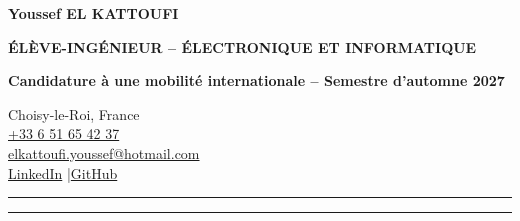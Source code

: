 \documentclass[9pt,a4paper]{extarticle}
\newcommand{\stage}{Candidature à une mobilité internationale – Semestre d'automne 2027}
\begin{document}
\begin{minipage}[t]{.635\linewidth}
  {\fontsize{21.2}{22.3}\selectfont\bfseries\color{bleu}Youssef EL KATTOUFI}\par\vspace{1.5pt}
  {\fontsize{10.2}{11.5}\selectfont\bfseries\color{rouge}ÉLÈVE-INGÉNIEUR -- ÉLECTRONIQUE ET INFORMATIQUE}\par\vspace{1.1pt}
  {\fontsize{9.15}{10}\selectfont\bfseries\color{bleu}\stage}\par
\end{minipage}\hfill
\begin{minipage}[t]{.355\linewidth}\raggedleft
  {\fontsize{8.7}{10.2}\selectfont
  Choisy-le-Roi, France\\
  \href{tel:+33651654237}{+33 6 51 65 42 37}\\
  \href{mailto:elkattoufi.youssef@hotmail.com}{elkattoufi.youssef@hotmail.com}\\
  \href{https://www.linkedin.com/in/youssef-el-kattoufi-5a04a0282/}{LinkedIn} \quad\textcolor{gris}{|}\quad \href{https://github.com/Darkzveller}{GitHub} }
\end{minipage}
\vspace{4.1pt}
\textcolor{rouge}{\rule{1.35cm}{1.75pt}}\hspace{1pt}\textcolor{gris!65}{\rule{\dimexpr\linewidth-1.45cm\relax}{.6pt}}\par\vspace{3.0pt}
\end{document}
